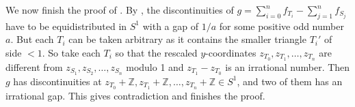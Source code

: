\documentclass[a4paper]{amsart}
\theoremstyle{plain}
\theoremstyle{definition}
\begin{document}
We now finish the proof of . By , the discontinuities of \(g = \sum_{i=0}^n f_{T_i} - \sum_{j=1}^n f_{S_j}\) have to be equidistributed in \(S^1\) with a gap of \(1/a\) for some positive odd number \(a\).
But each \(T_i\) can be taken arbitrary as it contains the smaller triangle \(T_i'\) of side \(< 1\). So take each \(T_i\) so that the rescaled \(y\)-coordinates \(z_{T_0}, z_{T_1}, \dots, z_{T_n}\) are different from \(z_{S_1}, z_{S_2}, \dots, z_{S_n}\) modulo 1 and \(z_{T_1} - z_{T_0}\) is an irrational number.
Then \(g\) has discontinuities at \(z_{T_0} + \mathbb{Z}, z_{T_1} + \mathbb{Z}, \dots, z_{T_n} + \mathbb{Z} \in S^1\), and two of them has an irrational gap. This gives contradiction and finishes the proof.

\printbibliography
\end{document}
